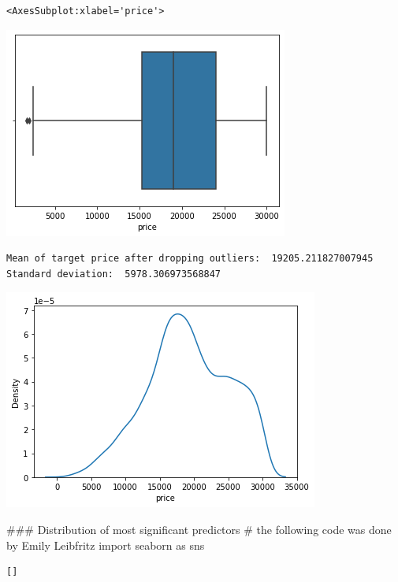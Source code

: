 \documentclass[
  letterpaper,
  DIV=11,
  numbers=noendperiod]{scrartcl}
\newenvironment{Shaded}{\begin{snugshade}}{\end{snugshade}}
\newcommand{\CommentTok}[1]{\textcolor[rgb]{0.37,0.37,0.37}{#1}}
\newcommand{\ImportTok}[1]{\textcolor[rgb]{0.00,0.46,0.62}{#1}}
\newcommand{\NormalTok}[1]{\textcolor[rgb]{0.00,0.23,0.31}{#1}}
\begin{document}
\begin{verbatim}
<AxesSubplot:xlabel='price'>
\end{verbatim}

\includegraphics{Final Project Report - Used Cars Regression_files/figure-pdf/cell-4-output-3.png}

\begin{verbatim}
Mean of target price after dropping outliers:  19205.211827007945
Standard deviation:  5978.306973568847
\end{verbatim}

\includegraphics{Final Project Report - Used Cars Regression_files/figure-pdf/cell-5-output-2.png}

\begin{Shaded}
\begin{Highlighting}[]
\CommentTok{\#\#\# Distribution of most significant predictors}
\CommentTok{\# the following code was done by Emily Leibfritz}
\ImportTok{import}\NormalTok{ seaborn }\ImportTok{as}\NormalTok{ sns}
\end{Highlighting}
\end{Shaded}

\begin{verbatim}
[]
\end{verbatim}
\end{document}
